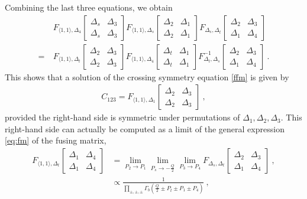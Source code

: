 \documentclass[12pt, a4paper, notitlepage, twoside]{report}
\numberwithin{equation}{section}
\theoremstyle{break}
\begin{document}
Combining the last three equations, we obtain
\begin{align}
 & F_{\langle 1,1\rangle, \Delta_{4}} \begin{bmatrix} \Delta_s & \Delta_3\\ \Delta_s & \Delta_3\end{bmatrix}  
 F_{\langle 1,1\rangle, \Delta_{s}} \begin{bmatrix} \Delta_2 & \Delta_1\\ \Delta_2 & \Delta_1\end{bmatrix}  
 F_{\Delta_s,\Delta_t}\begin{bmatrix} \Delta_2 & \Delta_3 \\ \Delta_1 & \Delta_4 \end{bmatrix}
 \nonumber
 \\
=\ & 
F_{\langle 1,1\rangle, \Delta_{t}} \begin{bmatrix} \Delta_2 & \Delta_3\\ \Delta_2 & \Delta_3\end{bmatrix}
F_{\langle 1,1\rangle, \Delta_{4}} \begin{bmatrix} \Delta_t & \Delta_1\\ \Delta_t & \Delta_1\end{bmatrix}
F^{-1}_{\Delta_t,\Delta_s}\begin{bmatrix} \Delta_2 & \Delta_3 \\ \Delta_1 & \Delta_4 \end{bmatrix}
\ .
\end{align}
This shows that a solution of the crossing symmetry equation \eqref{ffm} is given by 
\begin{align}
 C_{123} = F_{\langle 1,1\rangle, \Delta_{1}} \begin{bmatrix} \Delta_2 & \Delta_3\\ \Delta_2 & \Delta_3\end{bmatrix}\ ,
\end{align}
provided the right-hand side is symmetric under permutations of $\Delta_1,\Delta_2,\Delta_3$. 
This right-hand side can actually be computed as a limit of the general expression \eqref{eq:fm} of the fusing matrix,
\begin{align}
 F_{\langle 1,1\rangle, \Delta_{t}} \begin{bmatrix} \Delta_1 & \Delta_4\\ \Delta_1 & \Delta_4\end{bmatrix} 
 & = 
 \lim_{P_2\to P_1}\lim_{P_s\to -\frac{Q}{2}} \lim_{P_3\to P_4} 
 F_{\Delta_s,\Delta_t}\begin{bmatrix} \Delta_2 & \Delta_3 \\ \Delta_1 & \Delta_4 \end{bmatrix} \ ,
 \label{eq:flim}
 \\
  &\propto \frac{1}{\prod_{\pm,\pm,\pm} \Gamma_b(\frac{Q}{2} \pm P_t\pm P_1\pm P_4)}\ ,
  \label{eq:fdozz}
\end{align}
\end{document}
